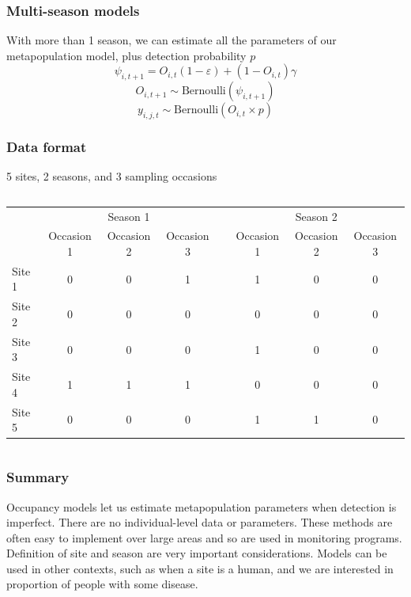 \documentclass[color=usenames,dvipsnames]{beamer}\usepackage[]{graphicx}\usepackage[]{xcolor}
\begin{document}
\begin{frame}
  \frametitle{Multi-season models}
  \large
  With more than 1 season, we can estimate all the parameters of our
  metapopulation model, plus detection probability $p$
  \pause
  \[
    \psi_{i,t+1} = O_{i,t}(1-\varepsilon) + (1-O_{i,t})\gamma
  \]
  \[
    O_{i,t+1} \sim \mbox{Bernoulli}(\psi_{i,t+1})
  \]
  \[
    y_{i,j,t} \sim \mathrm{Bernoulli}(O_{i,t} \times p)
  \]
\end{frame}




\begin{frame}
  \frametitle{Data format}
  {%
    \centering \large 5 sites, 2 seasons, and 3 sampling occasions \par}
  \vspace{0.3cm}
  \begin{columns}
    \column{\dimexpr\paperwidth-10pt}
    \scriptsize
      \begin{tabular}{lccccccc}
        \hline
        & \multicolumn{3}{c}{Season 1} & &
        \multicolumn{3}{c}{Season 2} \\
        \cline{2-4} \cline{6-8}
        & Occasion 1 & Occasion 2 & Occasion 3 & & Occasion 1 & Occasion 2 & Occasion 3 \\
        \hline
        Site 1 & 0 & 0 & 1 & & 1 & 0 & 0 \\
        Site 2 & 0 & 0 & 0 & & 0 & 0 & 0 \\
        Site 3 & 0 & 0 & 0 & & 1 & 0 & 0 \\
        Site 4 & 1 & 1 & 1 & & 0 & 0 & 0 \\
        Site 5 & 0 & 0 & 0 & & 1 & 1 & 0 \\
        \hline
      \end{tabular}
  \end{columns}
\end{frame}




\begin{frame}
  \frametitle{Summary}
  \large
  Occupancy models let us estimate metapopulation parameters
      when detection is imperfect. 
  \pause
  \vfill
  There are no individual-level data or parameters.
  \pause
  \vfill
  These methods are often easy to implement over large areas
  and so are used in monitoring programs. 
  \pause
  \vfill
  Definition of site and season are very important considerations. 
  \pause
  \vfill
  Models can be used in other contexts, such as when a site is
  a human, and we are interested in proportion of people with some disease. 
\end{frame}









\end{document}
